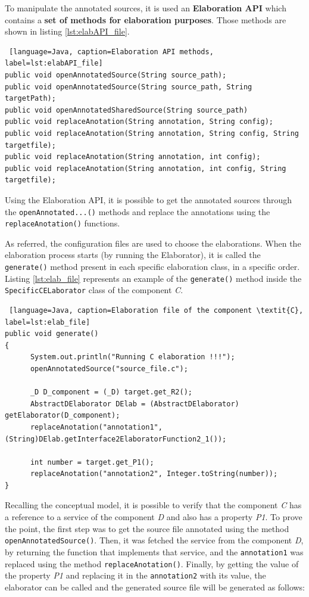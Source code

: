 \documentclass[12pt]{article}
\begin{document}
{To manipulate the annotated sources, it is used an \textbf{Elaboration API} which contains a \textbf{set of methods for elaboration purposes}. Those methods are shown in listing \ref{lst:elabAPI_file}.


\begin{lstlisting} [language=Java, caption=Elaboration API methods, label=lst:elabAPI_file]
public void openAnnotatedSource(String source_path);
public void openAnnotatedSource(String source_path, String targetPath);
public void openAnnotatedSharedSource(String source_path) 
public void replaceAnotation(String annotation, String config);
public void replaceAnotation(String annotation, String config, String targetfile);
public void replaceAnotation(String annotation, int config);
public void replaceAnotation(String annotation, int config, String targetfile);
\end{lstlisting}

Using the Elaboration API, it is possible to get the annotated sources through the \texttt{openAnnotated...()} methods and replace the annotations using the \texttt{replaceAnotation()} functions.

As referred, the configuration files are used to choose the elaborations. When the elaboration process starts (by running the Elaborator), it is called the \texttt{generate()} method present in each specific elaboration class, in a specific order. Listing \ref{lst:elab_file} represents an example of the \texttt{generate()} method inside the \texttt{SpecificCELaborator} class of the component \textit{C}. 

\begin{lstlisting} [language=Java, caption=Elaboration file of the component \textit{C}, label=lst:elab_file]
public void generate()
{
      System.out.println("Running C elaboration !!!");	
      openAnnotatedSource("source_file.c");

      _D D_component = (_D) target.get_R2();
      AbstractDElaborator DElab = (AbstractDElaborator) getElaborator(D_component);	
      replaceAnotation("annotation1",(String)DElab.getInterface2ElaboratorFunction2_1());

      int number = target.get_P1();
      replaceAnotation("annotation2", Integer.toString(number));
}
\end{lstlisting}

Recalling the conceptual model, it is possible to verify that the component \textit{C} has a reference to a service of the component \textit{D} and also has a property \textit{P1}. To prove the point, the first step was to get the source file annotated using the method \texttt{openAnnotatedSource()}. Then, it was fetched the service from the component \textit{D}, by returning the function  that implements that service, and the \texttt{annotation1} was replaced using the method \texttt{replaceAnotation()}. Finally, by getting the value of the property \textit{P1} and replacing it in the \texttt{annotation2} with its value, the elaborator can be called and the generated source file will be generated as follows:

}
\end{document}
